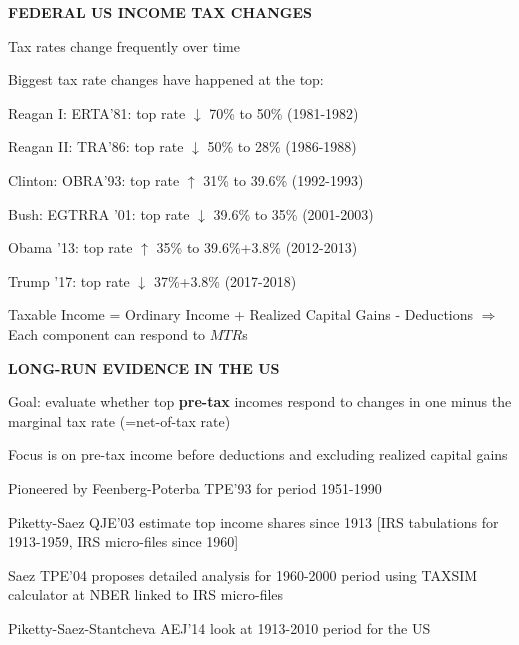 \documentclass[landscape]{slides}
\begin{document}
\begin{slide}
\begin{center}
{\bf FEDERAL US INCOME TAX CHANGES}
\end{center}
Tax rates change frequently over time

Biggest tax rate changes have happened at the top:

Reagan I: ERTA'81: top rate $\downarrow$ 70\% to 50\% (1981-1982)

Reagan II: TRA'86: top rate $\downarrow$ 50\% to 28\% (1986-1988)

Clinton: OBRA'93: top rate $\uparrow$ 31\% to 39.6\% (1992-1993)

Bush: EGTRRA '01: top rate $\downarrow$ 39.6\% to 35\% (2001-2003)

Obama '13:  top rate $\uparrow$ 35\% to 39.6\%+3.8\% (2012-2013)

Trump '17: top rate $\downarrow$ 37\%+3.8\% (2017-2018)

Taxable Income = Ordinary Income + Realized Capital Gains -
Deductions $\Rightarrow$ Each component can respond to $MTR$s
\end{slide}

\begin{slide}

\end{slide}

%

\begin{slide}

\end{slide}




\begin{slide}
\begin{center}
{\bf LONG-RUN EVIDENCE IN THE US}
\end{center}
Goal: evaluate whether top \textbf{pre-tax} incomes respond to changes in one minus
the marginal tax rate (=net-of-tax rate)

Focus is on pre-tax income before deductions and excluding realized
capital gains

Pioneered by Feenberg-Poterba TPE'93 for period 1951-1990

Piketty-Saez QJE'03 estimate top income shares since 1913 [IRS
tabulations for 1913-1959, IRS micro-files since 1960]

Saez TPE'04 proposes detailed analysis for 1960-2000 period using
TAXSIM calculator at NBER linked to IRS micro-files

Piketty-Saez-Stantcheva AEJ'14 look at 1913-2010 period for the US
\end{slide}
\end{document}
